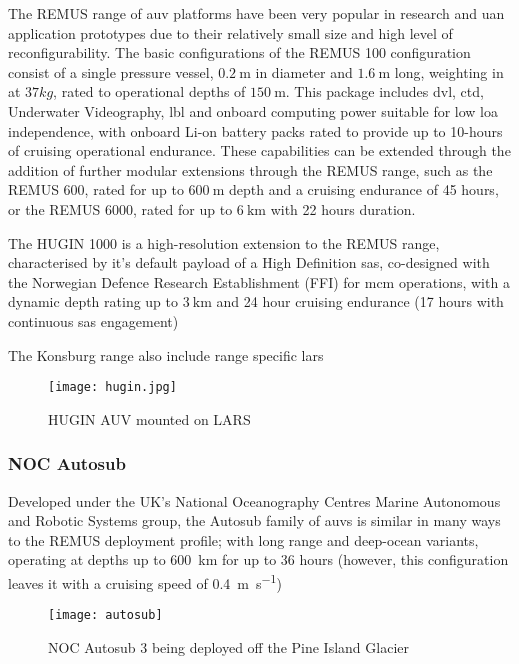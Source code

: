 The REMUS range of \gls{auv} platforms have been very popular in research and \gls{uan} application prototypes due to their relatively small size and high level of reconfigurability.
The basic configurations of the REMUS 100 configuration consist of a single pressure vessel, $\SI{0.2}{\meter}$ in diameter and $\SI{1.6}{\meter}$ long, weighting in at $37kg$, rated to operational depths of $\SI{150}{\meter}$. 
This package includes \gls{dvl}, \gls{ctd}, Underwater Videography, \gls{lbl} and onboard computing power suitable for low \gls{loa} independence, with onboard Li-on battery packs rated to provide up to 10-hours of cruising operational endurance.
These capabilities can be extended through the addition of further modular extensions through the REMUS range, such as the REMUS 600, rated for up to $\SI{600}{\meter}$ depth and a cruising endurance of 45 hours, or the REMUS 6000, rated for up to $\SI{6}{\kilo\meter}$ with 22 hours duration.

The HUGIN 1000 is a high-resolution extension to the REMUS range, characterised by it's default payload of a High Definition \gls{sas}, co-designed with the Norwegian Defence Research Establishment (FFI) for \gls{mcm} operations, with a dynamic depth rating up to $\SI{3}{\kilo\meter}$ and 24 hour cruising endurance (17 hours with continuous \gls{sas} engagement)

The Konsburg range also include range specific \gls{lars}
\begin{figure}[h]
	\centering
	\texttt{[image: hugin.jpg]}
	\caption{\label{fig:hugin}HUGIN AUV mounted on LARS}
\end{figure}
\subsubsection{NOC Autosub}

Developed under the UK's National Oceanography Centres Marine Autonomous and Robotic Systems group, the Autosub family of \glspl{auv} is similar in many ways to the REMUS deployment profile; with long range and deep-ocean variants, operating at depths up to \SI{600}{\kilo\meter} for up to 36 hours (however, this configuration leaves it with a cruising speed of \SI{0.4}{\meter\per\second})
\begin{figure}[h]
	\centering
	\texttt{[image: autosub]}
	\caption{\label{fig:autosub}NOC Autosub 3 being deployed off the Pine Island Glacier}
\end{figure}

